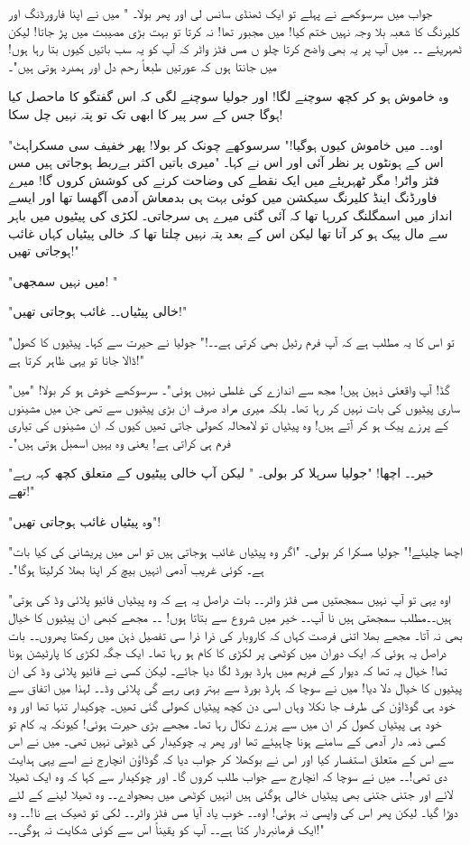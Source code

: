 جواب میں سرسوکھے نے پہلے تو ایک ٹھنڈی سانس لی اور پھر بولا۔ " میں نے اپنا فارورڈنگ اور کلیرنگ کا شعبہ بلا وجہ نہیں ختم کیا! میں مجبور تھا! نہ کرتا تو بہت بڑی مصیبت میں پڑ جاتا! لیکن ٹھہریئے ۔۔ میں آپ پر یہ بھی واضح کرتا چلو ں مس فٹز واٹر کہ آپ کو یہ سب باتیں کیوں بتا رہا ہوں! میں جانتا ہوں کہ عورتیں طبعاً رحم دل اور ہمدرد ہوتی ہیں"۔

وہ خاموش ہو کر کچھ سوچنے لگا! اور جولیا سوچنے لگی کہ اس گفتگو کا ماحصل کیا ہوگا جس کے سر پیر کا ابھی تک تو پتہ نہیں چل سکا!

"اوہ۔۔ میں خاموش کیوں ہوگیا!" سرسوکھے چونک کر بولا! پھر خفیف سی مسکراہٹ اس کے ہونٹوں پر نظر آئی اور اس نے کہا۔ 
"میری باتیں اکثر بےربط ہوجاتی ہیں مس فٹز واٹر! مگر ٹھہریئے میں ایک نقطے کی وضاحت کرنے کی کوشش کروں گا! میرے فاورڈنگ اینڈ کلیرنگ سیکشن میں کوئی بہت ہی بدمعاش آدمی آگھسا تھا اور ایسے انداز میں اسمگلنگ کررہا تھا کہ آئی گئی میرے ہی سرجاتی۔ لکڑی کی پیٹیوں میں باہر سے مال پیک ہو کر آتا تھا لیکن اس کے بعد پتہ نہیں چلتا تھا کہ خالی پیٹیاں کہاں غائب ہوجاتی تھیں!"

"میں نہیں سمجھی! "

"خالی پیٹیاں۔۔ غائب ہوجاتی تھیں!"

"تو اس کا یہ مطلب ہے کہ آپ فرم رٹیل بھی کرتی ہے۔۔!" جولیا نے حیرت سے کہا۔ پیٹیوں کا کھول ڈالا جانا تو یہی ظاہر کرتا ہے!"

"گڈ! آپ واقعئی ذہین ہیں! مجھ سے اندازے کی غلطی نہیں ہوئی"۔ سرسوکھے خوش ہو کر بولا! "میں ساری پیٹیوں کی بات نہیں کر رہا تھا۔ بلکہ میری مراد صرف ان بڑی پیٹیوں سے تھی جن میں مشینوں کے پرزے پیک ہو کر آتے ہیں! وہ پیٹیاں تو لامحالہ کھولی جاتی تھیں کیوں کہ ان مشینوں کی تیاری فرم ہی کراتی ہے! یعنی وہ یہیں اسمبل ہوتی ہیں"۔

"خیر۔۔ اچھا! "جولیا سرہلا کر بولی۔ " لیکن آپ خالی پیٹیوں کے متعلق کچھ کہہ رہے تھے!"

"وہ پیٹیاں غائب ہوجاتی تھیں"!

"اچھا چلیئے!" جولیا مسکرا کر بولی۔ "اگر وہ پیٹیاں غائب ہوجاتی ہیں تو اس میں پریشانی کی کیا بات ہے۔ کوئی غریب آدمی انہیں بیچ کر اپنا بھلا کرلیتا ہوگا"۔

"اوہ یہی تو آپ نہیں سمجھتیں مس فٹز واٹر۔۔ بات دراصل یہ ہے کہ وہ پیٹیاں فائیو پلائی وڈ کی ہوتی ہیں۔۔مطلب سمجھتی ہیں نا آپ۔۔ خیر میں شروع سے بتاتا ہوں! ۔۔ مجھے کبھی ان پیٹیوں کا خیال بھی نہ آتا۔ مجھے بھلا اتنی فرصت کہاں کہ کاروبار کی ذرا ذرا سی تفصیل ذہن میں رکھتا پھروں۔۔ بات دراصل یہ ہوئی کہ ایک دوران میں کوٹھی پر لکڑی کا کام ہو رہا تھا۔ ایک جگہ لکڑی کا پارٹیشن ہونا تھا! خیال یہ تھا کہ دیوار کے فریم میں ہارڈ بورڈ لگا دیا جائے۔ لیکن کسی نے فائیو پلائی وڈ کی ان پیٹیوں کا خیال دلا دیا! میں نے سوچا کہ ہارڈ بورڈ سے بہتر وہی رہے گی پلائی وڈ۔۔ لہذا میں اتفاق سے خود ہی گوڈاؤن کی طرف جا نکلا وہاں اسی دن کچھ پیٹیاں کھولی گئی تھیں۔ چوکیدار تنہا تھا اور وہ خود ہی پیٹیاں کھول کر ان میں سے پرزے نکال رہا تھا۔ مجھے بڑی حیرت ہوئی! کیونکہ یہ کام تو کسی ذمہ دار آدمی کے سامنے ہونا چاہیئے تھا اور پھر یہ چوکیدار کی ڈیوٹی نہیں تھی۔ میں نے اس سے اس کے متعلق استفسار کیا اور اس نے بوکھلا کر جواب دیا کہ گوڈاؤن انچارج نے اسے یہی ہدایت دی تھی!۔۔ میں نے سوچا کہ انچارج سے جواب طلب کروں گا۔ اور چوکیدار سے کہا کہ وہ ایک ٹھیلا لائے اور جتنی جتنی بھی پیٹیاں خالی ہوگئی ہیں انہیں کوٹھی میں بھجوادے۔۔ وہ ٹھیلا لینے کے لئے دوڑا گیا۔ لیکن پھر اس کی واپسی نہ ہوئی! اوہ۔۔ خوب یاد آیا مس فٹز واٹر۔۔ لکی تو ٹھیک ہے نا!۔۔ وہ ایک فرمانبردار کتا ہے۔۔ آپ کو یقیناً اس سے کوئی شکایت نہ ہوگی۔۔!"

